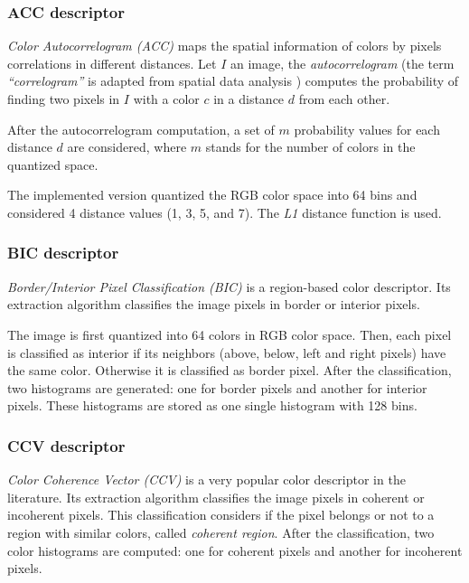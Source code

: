 \subsubsection{ACC descriptor}

\emph{Color Autocorrelogram (ACC) }\cite{huang1997image} maps the spatial information of colors by pixels correlations in different distances. Let $I$ an image, the \emph{autocorrelogram} (the term \emph{“correlogram”} is adapted from spatial data analysis \cite{upton1985spatial}) computes the probability of finding two pixels in $I$ with a color $c$ in a distance $d$ from each other. 

After the autocorrelogram computation, a set of $m$ probability values for each distance $d$ are considered, where $m$ stands for the number of colors in the quantized space. 

The implemented version quantized the RGB color space into 64 bins and considered 4 distance values (1, 3, 5, and 7). The \emph{L1} distance function is used.

\subsubsection{BIC descriptor}

\emph{Border/Interior Pixel Classification (BIC)} \cite{stehling2002compact} is a region-based color descriptor. Its extraction algorithm classifies the image pixels in border or interior
pixels. 

The image is first quantized into 64 colors in RGB color space. Then, each pixel is classified as interior
if its neighbors (above, below, left and right pixels) have the same color. Otherwise it is classified as border pixel. After the classification, two histograms are generated: one for border pixels and another for interior pixels. These histograms are stored as one single histogram with 128 bins.

\subsubsection{CCV descriptor}

\emph{Color Coherence Vector (CCV)} \cite{pass1997comparing} is a very popular color descriptor in the literature. Its extraction algorithm classifies the image pixels in coherent or incoherent pixels. This classification considers if the pixel belongs or not to a region with similar colors, called \emph{coherent region}. After the classification, two color histograms are computed: one for coherent pixels and another for incoherent pixels.

